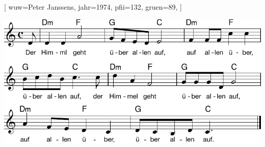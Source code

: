 [
    wuw={Peter Janssens}, 
    jahr={1974},
    pfii={132}, 
    gruen={89},
]

\beginverse
\endverse
\centering\includegraphics[width=1\textwidth]{Noten/Lied107a.pdf}

\endsong

